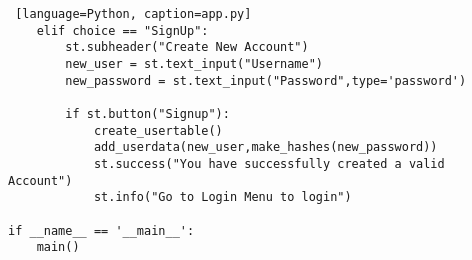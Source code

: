 \begin{lstlisting} [language=Python, caption=app.py]
    elif choice == "SignUp":
        st.subheader("Create New Account")
        new_user = st.text_input("Username")
        new_password = st.text_input("Password",type='password')

        if st.button("Signup"):
            create_usertable()
            add_userdata(new_user,make_hashes(new_password))
            st.success("You have successfully created a valid Account")
            st.info("Go to Login Menu to login")

if __name__ == '__main__':   	
    main()
\end{lstlisting}
